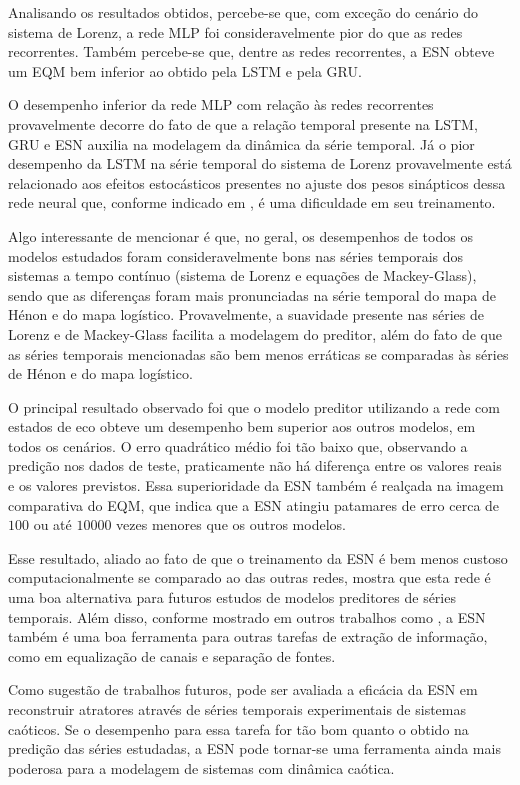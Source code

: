 \documentclass[a4paper, 12pt]{article}
\begin{document}
Analisando os resultados obtidos, percebe-se que, com exceção do cenário do sistema de Lorenz, a rede MLP foi consideravelmente pior do que as redes recorrentes. Também percebe-se que, dentre as redes recorrentes, a ESN obteve um EQM bem inferior ao obtido pela LSTM e pela GRU.

O desempenho inferior da rede MLP com relação às redes recorrentes provavelmente decorre do fato de que a relação temporal presente na LSTM, GRU e ESN auxilia na modelagem da dinâmica da série temporal. Já o pior desempenho da LSTM na série temporal do sistema de Lorenz provavelmente está relacionado aos efeitos estocásticos presentes no ajuste dos pesos sinápticos dessa rede neural que, conforme indicado em \cite{doya1992bifurcations}, é uma dificuldade em seu treinamento.

Algo interessante de mencionar é que, no geral, os desempenhos de todos os modelos estudados foram consideravelmente bons nas séries temporais dos sistemas a tempo contínuo (sistema de Lorenz e equações de Mackey-Glass), sendo que as diferenças foram mais pronunciadas na série temporal do mapa de Hénon e do mapa logístico. Provavelmente, a suavidade presente nas séries de Lorenz e de Mackey-Glass facilita a modelagem do preditor, além do fato de que as séries temporais mencionadas são bem menos erráticas se comparadas às séries de Hénon e do mapa logístico.

O principal resultado observado foi que o modelo preditor utilizando a rede com estados de eco obteve um desempenho bem superior aos outros modelos, em todos os cenários. O erro quadrático médio foi tão baixo que, observando a predição nos dados de teste, praticamente não há diferença entre os valores reais e os valores previstos. Essa superioridade da ESN também é realçada na imagem  comparativa do EQM, que indica que a ESN  atingiu patamares de erro cerca de $100$ ou até $10000$ vezes menores que os outros modelos. 

Esse resultado, aliado ao fato de que o treinamento da ESN é bem menos custoso computacionalmente se comparado ao das outras redes, mostra que esta rede é uma boa alternativa para futuros estudos de modelos preditores de séries temporais. Além disso, conforme mostrado em outros trabalhos como \cite{jaeger2004harnessing, jaeger2007echo, boccato2013novas}, a ESN também é uma boa ferramenta para outras tarefas de extração de informação, como em equalização de canais e separação de fontes. 

Como sugestão de trabalhos futuros, pode ser avaliada a eficácia da ESN em reconstruir atratores através de séries temporais experimentais de sistemas caóticos. Se o desempenho para essa tarefa for tão bom quanto o obtido na predição das séries estudadas, a ESN pode tornar-se uma ferramenta ainda mais poderosa para a modelagem de sistemas com dinâmica caótica.



{\footnotesize }

\end{document}
